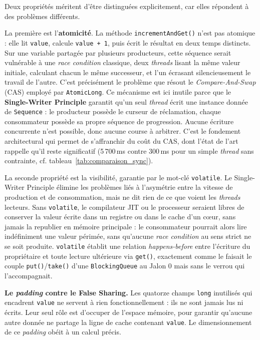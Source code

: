 Deux propriétés méritent d'être distinguées explicitement, car elles répondent à des problèmes différents.

La première est l'\textbf{atomicité}. La méthode \texttt{incrementAndGet()} n'est pas atomique : elle lit \texttt{value}, calcule \texttt{value + 1}, puis écrit le résultat en deux temps distincts. Sur une variable partagée par plusieurs producteurs, cette séquence serait vulnérable à une \textit{race condition} classique, deux \textit{threads} lisant la même valeur initiale, calculant chacun le même successeur, et l'un écrasant silencieusement le travail de l'autre. C'est précisément le problème que résout le \textit{Compare-And-Swap} (CAS) employé par \texttt{AtomicLong}. Ce mécanisme est ici inutile parce que le \textbf{Single-Writer Principle} garantit qu'un seul \textit{thread} écrit une instance donnée de \texttt{Sequence} : le producteur possède le curseur de réclamation, chaque consommateur possède sa propre séquence de progression. Aucune écriture concurrente n'est possible, donc aucune course à arbitrer. C'est le fondement architectural qui permet de s'affranchir du coût du CAS, dont l'état de l'art rappelle qu'il reste significatif (5\,700\,ms contre 300\,ms pour un simple \textit{thread} sans contrainte, cf. tableau~\ref{tab:comparaison_sync}).

La seconde propriété est la visibilité, garantie par le mot-clé \texttt{volatile}. Le Single-Writer Principle élimine les problèmes liés à l'asymétrie entre la vitesse de production et de consommation, mais ne dit rien de ce que voient les \textit{threads} lecteurs. Sans \texttt{volatile}, le compilateur JIT ou le processeur seraient libres de conserver la valeur écrite dans un registre ou dans le cache d'un cœur, sans jamais la republier en mémoire principale : le consommateur pourrait alors lire indéfiniment une valeur périmée, sans qu'aucune \textit{race condition} au sens strict ne se soit produite. \texttt{volatile} établit une relation \textit{happens-before} entre l'écriture du propriétaire et toute lecture ultérieure via \texttt{get()}, exactement comme le faisait le couple \texttt{put()}/\texttt{take()} d'une \texttt{BlockingQueue} au Jalon 0 mais sans le verrou qui l'accompagnait.

\textbf{Le \textit{padding} contre le False Sharing.} Les quatorze champs \texttt{long} inutilisés qui encadrent \texttt{value} ne servent à rien fonctionnellement : ils ne sont jamais lus ni écrits. Leur seul rôle est d'occuper de l'espace mémoire, pour garantir qu'aucune autre donnée ne partage la ligne de cache contenant \texttt{value}. Le dimensionnement de ce \textit{padding} obéit à un calcul précis.

